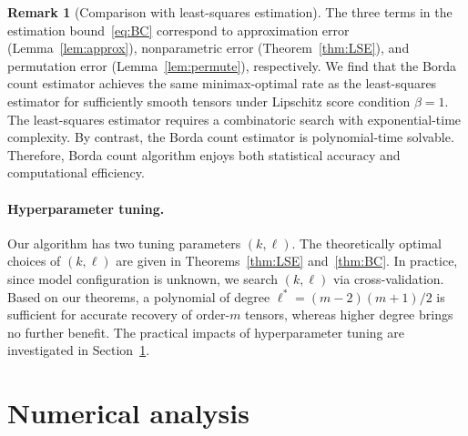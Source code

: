 \documentclass[11pt]{article}
\theoremstyle{definition}
\newtheorem{rmk}{Remark}
\begin{document}
\begin{rmk}[Comparison with least-squares estimation] The three terms in the estimation bound~\eqref{eq:BC} correspond to approximation error (Lemma~\ref{lem:approx}), nonparametric error (Theorem~\ref{thm:LSE}), and permutation error (Lemma~\ref{lem:permute}), respectively. 
We find that the Borda count estimator achieves the same minimax-optimal rate as the least-squares estimator for sufficiently smooth tensors under Lipschitz score condition $\beta =1$. The least-squares estimator requires a combinatoric search with exponential-time complexity. By contrast, the Borda count estimator is polynomial-time solvable. Therefore, Borda count algorithm enjoys both statistical accuracy and computational efficiency. 
\end{rmk}


\paragraph{Hyperparameter tuning.}
Our algorithm has two tuning parameters $(k,\ell)$. The theoretically optimal choices of $(k,\ell)$ are given in Theorems~\ref{thm:LSE} and~\ref{thm:BC}. In practice, since model configuration is unknown, we search $(k,\ell)$ via cross-validation. 
Based on our theorems, a polynomial of degree $\ell^*=(m-2)(m+1)/2$ is sufficient for accurate recovery of order-$m$ tensors, whereas higher degree brings no further benefit. The practical impacts of hyperparameter tuning are investigated in Section~\ref{sec:sim}. 

\section{Numerical analysis}\label{sec:sim}
\end{document}
